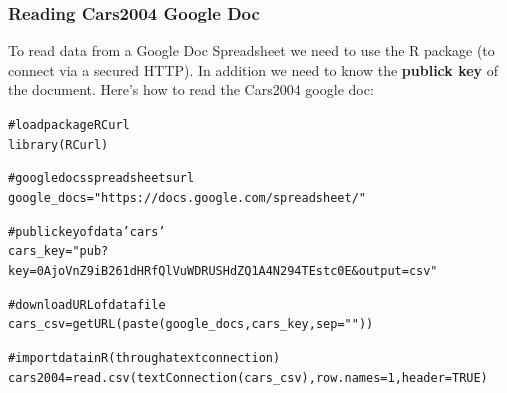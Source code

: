 \documentclass{beamer}\usepackage[]{graphicx}\usepackage[]{color}
\makeatletter
\newcommand{\hlnum}[1]{\textcolor[rgb]{0.063,0.58,0.627}{#1}}%
\newcommand{\hlstr}[1]{\textcolor[rgb]{0.063,0.58,0.627}{#1}}%
\newcommand{\hlcom}[1]{\textcolor[rgb]{0.588,0.588,0.588}{#1}}%
\newcommand{\hlstd}[1]{\textcolor[rgb]{0.196,0.196,0.196}{#1}}%
\newcommand{\hlkwb}[1]{\textcolor[rgb]{0.627,0,0.314}{#1}}%
\newcommand{\hlkwc}[1]{\textcolor[rgb]{0,0.631,0.314}{#1}}%
\newcommand{\hlkwd}[1]{\textcolor[rgb]{0.78,0.227,0.412}{#1}}%
\newenvironment{kframe}{%
 \def\at@end@of@kframe{}%
 \ifinner\ifhmode%
  \def\at@end@of@kframe{\end{minipage}}%
  \begin{minipage}{\columnwidth}%
 \fi\fi%
 \def\FrameCommand##1{\hskip\@totalleftmargin \hskip-\fboxsep
 \colorbox{shadecolor}{##1}\hskip-\fboxsep
     \hskip-\linewidth \hskip-\@totalleftmargin \hskip\columnwidth}%
 \MakeFramed {\advance\hsize-\width
   \@totalleftmargin\z@ \linewidth\hsize
   \@setminipage}}%
 {\par\unskip\endMakeFramed%
 \at@end@of@kframe}
\newenvironment{knitrout}{}{} %
\makeatother
\begin{document}

\begin{frame}[fragile]
\frametitle{Reading Cars2004 Google Doc}

To read data from a Google Doc Spreadsheet we need to use the R package  (to connect via a secured HTTP). In addition we need to know the \textbf{publick key} of the document. Here's how to read the Cars2004 google doc:
\begin{knitrout}\tiny
{}\color{fgcolor}\begin{kframe}
\begin{alltt}
\hlcom{# load package RCurl}
\hlkwd{library}\hlstd{(RCurl)}

\hlcom{# google docs spreadsheets url}
\hlstd{google_docs} \hlkwb{=} \hlstr{"https://docs.google.com/spreadsheet/"}

\hlcom{# public key of data 'cars'}
\hlstd{cars_key} \hlkwb{=} \hlstr{"pub?key=0AjoVnZ9iB261dHRfQlVuWDRUSHdZQ1A4N294TEstc0E&output=csv"}

\hlcom{# download URL of data file}
\hlstd{cars_csv} \hlkwb{=} \hlkwd{getURL}\hlstd{(}\hlkwd{paste}\hlstd{(google_docs, cars_key,} \hlkwc{sep} \hlstd{=} \hlstr{""}\hlstd{))}

\hlcom{# import data in R (through a text connection)}
\hlstd{cars2004} \hlkwb{=} \hlkwd{read.csv}\hlstd{(}\hlkwd{textConnection}\hlstd{(cars_csv),} \hlkwc{row.names} \hlstd{=} \hlnum{1}\hlstd{,} \hlkwc{header} \hlstd{=} \hlnum{TRUE}\hlstd{)}
\end{alltt}
\end{kframe}
\end{knitrout}

\end{frame}

\end{document}

